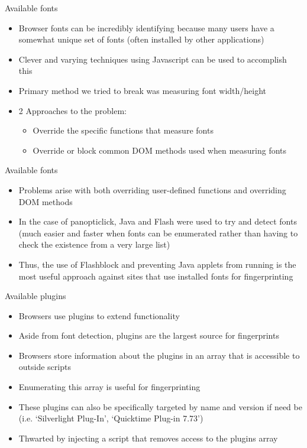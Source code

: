\begin{frame}[fragile,t]{Available fonts}
	\begin{itemize}
		\item Browser fonts can be incredibly identifying because many users have a somewhat unique set of fonts (often installed by other applications)
		\item Clever and varying techniques using Javascript can be used to accomplish this
		\item Primary method we tried to break was measuring font width/height
		\item 2 Approaches to the problem:
			\begin{itemize}
				\item Override the specific functions that measure fonts
				\item Override or block common DOM methods used when measuring fonts
			\end{itemize}
	\end{itemize}
\end{frame}

\begin{frame}[fragile,t]{Available fonts}
	\begin{itemize}
		\item Problems arise with both overriding user-defined functions and overriding DOM methods
		\item In the case of panopticlick, Java and Flash were used to try and detect fonts (much easier and faster when fonts can be enumerated rather than having to check the existence from a very large list)
		\item Thus, the use of Flashblock and preventing Java applets from running is the most useful approach against sites that use installed fonts for fingerprinting
	\end{itemize}
\end{frame}

\begin{frame}[fragile,t]{Available plugins}
	\begin{itemize}
		\item Browsers use plugins to extend functionality
		\item Aside from font detection, plugins are the largest source for fingerprints
		\item Browsers store information about the plugins in an array that is accessible to outside scripts
		\item Enumerating this array is useful for fingerprinting
		\item These plugins can also be specifically targeted by name and version if need be (i.e. `Silverlight Plug-In', `Quicktime Plug-in 7.73')
		\item Thwarted by injecting a script that removes access to the plugins array
	\end{itemize}
\end{frame}

